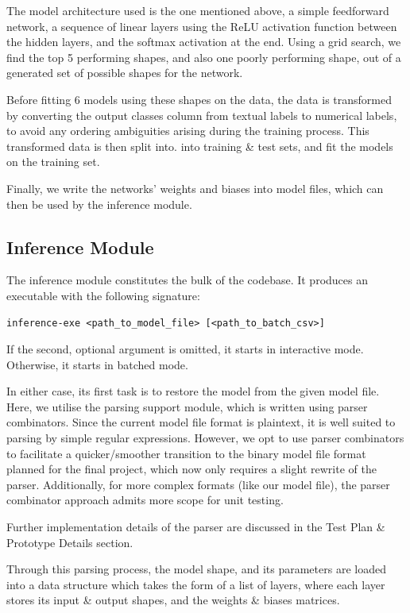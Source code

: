 \documentclass[12pt]{article}
\begin{document}
The model architecture used is the one mentioned above, a simple feedforward network, a sequence of linear layers using the ReLU activation function between the hidden layers, and the softmax activation at the end. Using a grid search, we find the top 5 performing shapes, and also one poorly performing shape, out of a generated set of possible shapes for the network.\bigskip

Before fitting 6 models using these shapes on the data, the data is transformed by converting the output classes column from textual labels to numerical labels, to avoid any ordering ambiguities arising during the training process. This transformed data is then split into. into training \& test sets, and fit the models on the training set.\bigskip

Finally, we write the networks' weights and biases into model files, which can then be used by the inference module.

\subsection{Inference Module}
The inference module constitutes the bulk of the codebase. It produces an executable with the following signature:
\begin{verbatim}
inference-exe <path_to_model_file> [<path_to_batch_csv>]
\end{verbatim}
If the second, optional argument is omitted, it starts in interactive mode. Otherwise, it starts in batched mode.\bigskip

In either case, its first task is to restore the model from the given model file. Here, we utilise the parsing support module, which is written using parser combinators. Since the current model file format is plaintext, it is well suited to parsing by simple regular expressions. However, we opt to use parser combinators to facilitate a quicker/smoother transition to the binary model file format planned for the final project, which now only requires a slight rewrite of the parser. Additionally, for more complex formats (like our model file), the parser combinator approach admits more scope for unit testing. 

Further implementation details of the parser are discussed in the Test Plan \& Prototype Details section. \bigskip

Through this parsing process, the model shape, and its parameters are loaded into a data structure which takes the form of a list of layers, where each layer stores its input \& output shapes, and the weights \& biases matrices.\bigskip
\end{document}
